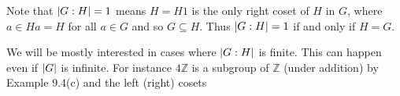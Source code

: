 \documentclass[11pt]{amsbook}
\DeclarePairedDelimiter{\abs}{\lvert}{\rvert}
\begin{document}
\hfill\break
Note that $\abs{G:H} = 1 $ means $H = H1$ is the only right coset of $H$ in $G$, where %
$a \in H a  = H$ for all $a \in G$ and so $G \subseteq H$. Thus $\abs{G:H} = 1$ if and only if $H = G$.

We will be mostly interested in cases where $\abs{G:H}$ is finite. This can happen even if $\abs{G}$ is infinite. For instance $4\mathds{Z}$ is a subgroup of $\mathds{Z}$ (under addition) by Example 9.4(c) and the left (right) cosets 


\end{document}
